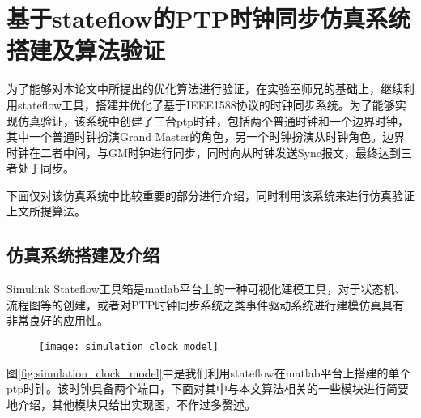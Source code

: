 
\chapter{基于stateflow的PTP时钟同步仿真系统搭建及算法验证}
为了能够对本论文中所提出的优化算法进行验证，在实验室师兄的基础上，继续利用stateflow工具，搭建并优化了基于IEEE1588协议的时钟同步系统。为了能够实现仿真验证，该系统中创建了三台ptp时钟，包括两个普通时钟和一个边界时钟，其中一个普通时钟扮演Grand Master的角色，另一个时钟扮演从时钟角色。边界时钟在二者中间，与GM时钟进行同步，同时向从时钟发送Sync报文，最终达到三者处于同步。

下面仅对该仿真系统中比较重要的部分进行介绍，同时利用该系统来进行仿真验证上文所提算法。

\section{仿真系统搭建及介绍}
Simulink Stateflow工具箱是matlab平台上的一种可视化建模工具，对于状态机、流程图等的创建，或者对PTP时钟同步系统之类事件驱动系统进行建模仿真具有非常良好的应用性。

\begin{figure}[!hbp]
  \centering
  \begin{minipage}[b]{1\textwidth}
    \captionstyle{\centering}
    \centering
    \texttt{[image: simulation\_clock\_model]}
  \end{minipage}     
\end{figure}

图\ref{fig:simulation_clock_model}中是我们利用stateflow在matlab平台上搭建的单个ptp时钟。该时钟具备两个端口，下面对其中与本文算法相关的一些模块进行简要地介绍，其他模块只给出实现图，不作过多赘述。

